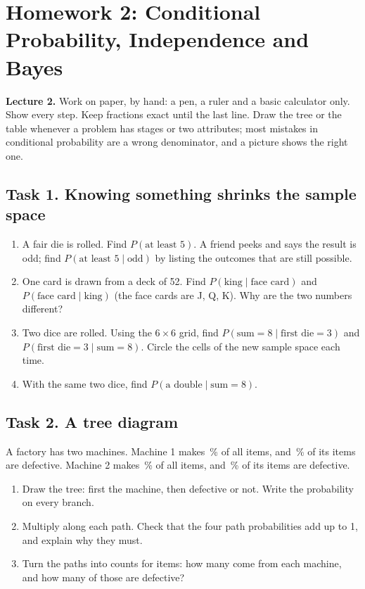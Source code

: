 \par


\clearpage
\section*{Homework 2: Conditional Probability, Independence and Bayes}
\noindent\textbf{Lecture 2.} Work on paper, by hand: a pen, a ruler and a basic calculator only. Show every step.
Keep fractions exact until the last line. Draw the tree or the table whenever a problem has stages or two
attributes; most mistakes in conditional probability are a wrong denominator, and a picture shows the right one.

\subsection*{Task 1. Knowing something shrinks the sample space}
\begin{enumerate}[label=(\alph*)]
  \item A fair die is rolled. Find $P(\text{at least } 5)$. A friend peeks and says the result is odd; find
        $P(\text{at least } 5 \mid \text{odd})$ by listing the outcomes that are still possible.
  \item One card is drawn from a deck of 52. Find $P(\text{king} \mid \text{face card})$ and
        $P(\text{face card} \mid \text{king})$ (the face cards are J, Q, K). Why are the two numbers different?
  \item Two dice are rolled. Using the $6 \times 6$ grid, find $P(\text{sum} = 8 \mid \text{first die} = 3)$ and
        $P(\text{first die} = 3 \mid \text{sum} = 8)$. Circle the cells of the new sample space each time.
  \item With the same two dice, find $P(\text{a double} \mid \text{sum} = 8)$.
\end{enumerate}

\subsection*{Task 2. A tree diagram}
A factory has two machines. Machine 1 makes \hwMOneShare\,\% of all items, and \hwMOneDef\,\% of its items are
defective. Machine 2 makes \hwMTwoShare\,\% of all items, and \hwMTwoDef\,\% of its items are defective.
\begin{enumerate}[label=(\alph*)]
  \item Draw the tree: first the machine, then defective or not. Write the probability on every branch.
  \item Multiply along each path. Check that the four path probabilities add up to 1, and explain why they must.
  \item Turn the paths into counts for \hwItems{} items: how many come from each machine, and how many of those are
        defective?
\end{enumerate}

